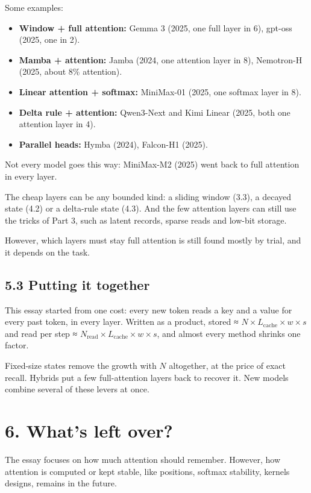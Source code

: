 \documentclass[11pt]{article}
\providecommand{\tightlist}{\setlength{\itemsep}{0pt}\setlength{\parskip}{0pt}}
\begin{document}
Some examples:

\begin{itemize}
\tightlist
\item
  \textbf{Window + full attention:} Gemma 3 (2025, one full layer in 6), gpt-oss (2025, one in 2).
\item
  \textbf{Mamba + attention:} Jamba (2024, one attention layer in 8), Nemotron-H (2025, about 8\% attention).
\item
  \textbf{Linear attention + softmax:} MiniMax-01 (2025, one softmax layer in 8).
\item
  \textbf{Delta rule + attention:} Qwen3-Next and Kimi Linear (2025, both one attention layer in 4).
\item
  \textbf{Parallel heads:} Hymba (2024), Falcon-H1 (2025).
\end{itemize}

Not every model goes this way: MiniMax-M2 (2025) went back to full attention in every layer.

The cheap layers can be any bounded kind: a sliding window (3.3), a decayed state (4.2) or a delta-rule state (4.3). And the few attention layers can still use the tricks of Part 3, such as latent records, sparse reads and low-bit storage.

However, which layers must stay full attention is still found mostly by trial, and it depends on the task.

\subsection{5.3 Putting it together}

This essay started from one cost: every new token reads a key and a value for every past token, in every layer. Written as a product, stored ≈ \(N\times L_{\text{cache}}\times w\times s\) and read per step ≈ \(N_{\text{read}}\times L_{\text{cache}}\times w\times s\), and almost every method shrinks one factor.

Fixed-size states remove the growth with \(N\) altogether, at the price of exact recall. Hybrids put a few full-attention layers back to recover it. New models combine several of these levers at once.

\section{6. What's left over?}

The essay focuses on how much attention should remember. However, how attention is computed or kept stable, like positions, softmax stability, kernels designs, remains in the future.
\end{document}
